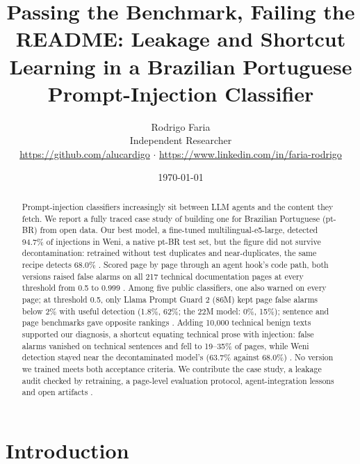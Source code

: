 \documentclass[11pt]{article}
\begin{document}
\title{Passing the Benchmark, Failing the README: Leakage and Shortcut Learning in a Brazilian Portuguese Prompt-Injection Classifier}
\author{Rodrigo Faria\\ \normalsize Independent Researcher\\ \normalsize \url{https://github.com/alucardigo} \ensuremath{\cdot} \url{https://www.linkedin.com/in/faria-rodrigo}}
\date{\today}
\maketitle

\begin{abstract}
Prompt-injection classifiers increasingly sit between LLM agents and the content they fetch. We report a fully traced case study of building one for Brazilian Portuguese (pt-BR) from open data. Our best model, a fine-tuned multilingual-e5-large, detected 94.7\% %
of injections in Weni, a native pt-BR test set, but the figure did not survive decontamination: retrained without test duplicates and near-duplicates, the same recipe detects 68.0\%%
. Scored page by page through an agent hook's code path, both versions raised false alarms on all 217 %
technical documentation pages at every threshold from 0.5 to 0.999%
. Among five public classifiers, one also warned on every page; at threshold 0.5, only Llama Prompt Guard 2 (86M) kept page false alarms below 2\% with useful detection (1.8\%, 62\%; the 22M model: 0\%, 15\%); sentence and page benchmarks gave opposite rankings%
. Adding 10,000 technical benign texts supported our diagnosis, a shortcut equating technical prose with injection: false alarms vanished on technical sentences and fell to 19–35\% of pages, while Weni detection stayed near the decontaminated model's (63.7\% against 68.0\%)%
. No version we trained meets both acceptance criteria. We contribute the case study, a leakage audit checked by retraining, a page-level evaluation protocol, agent-integration lessons and open artifacts%
.

\end{abstract}

\section{Introduction}\label{sec:1}
\end{document}
